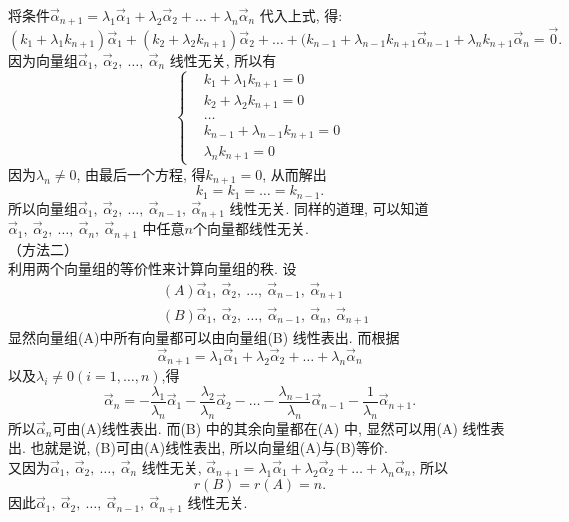 \documentclass[a4paper]{book}
\begin{document}
将条件$\vec{\alpha}_{n+1}=\lambda_1\vec{\alpha}_1+\lambda_2\vec{\alpha}_2+\dots+\lambda_n\vec{\alpha}_n$ 代入上式, 得:
$$(k_1+\lambda_1k_{n+1})\vec{\alpha}_1+(k_2+\lambda_2k_{n+1})\vec{\alpha}_2+\dots+(k_{n-1}+\lambda_{n-1}k_{n+1}\vec{\alpha}_{n-1}+
\lambda_nk_{n+1}\vec{\alpha}_n=\vec{0}.$$
因为向量组$\vec{\alpha}_1, \ \vec{\alpha}_2, \ \dots,\ \vec{\alpha}_n$ 线性无关, 所以有
\begin{displaymath}\left\{\begin{aligned}&k_1+\lambda_1k_{n+1}=0\\&k_2+\lambda_2k_{n+1}=0\\&\dots \\ &k_{n-1}+\lambda_{n-1}k_{n+1}=0 \\ &\lambda_nk_{n+1}=0\end{aligned}
\right.\end{displaymath}
因为$\lambda_n\not=0$, 由最后一个方程, 得$k_{n+1}=0$, 从而解出$$k_1=k_1=\dots=k_{n-1}.$$
所以向量组$\vec{\alpha}_1, \ \vec{\alpha}_2, \ \dots,\ \vec{\alpha}_{n-1},\ \vec{\alpha}_{n+1}$ 线性无关. 同样的道理,
可以知道$\vec{\alpha}_1, \ \vec{\alpha}_2, \ \dots,\ \vec{\alpha}_n,\ \vec{\alpha}_{n+1}$ 中任意$n$个向量都线性无关.\\
（方法二）\\
利用两个向量组的等价性来计算向量组的秩. 设
\begin{displaymath}\begin{aligned}&(A)\vec{\alpha}_1,  \ \vec{\alpha}_2, \ \dots,\ \vec{\alpha}_{n-1},\ \vec{\alpha}_{n+1}\\
&(B)\vec{\alpha}_1, \ \vec{\alpha}_2, \ \dots,\ \vec{\alpha}_{n-1},\ \vec{\alpha}_n,\ \vec{\alpha}_{n+1}\end{aligned}\end{displaymath}
显然向量组(A)中所有向量都可以由向量组(B) 线性表出. 而根据$$\vec{\alpha}_{n+1}=\lambda_1\vec{\alpha}_1+\lambda_2\vec{\alpha}_2+\dots+\lambda_n\vec{\alpha}_n$$ 以及$\lambda_i\not=0(i=1,
\dots,n)$,得
$$\vec{\alpha}_n=-\frac{\lambda_1}{\lambda_n}\vec{\alpha}_1-\frac{\lambda_2}{\lambda_n}\vec{\alpha}_2-\dots-
\frac{\lambda_{n-1}}{\lambda_n}\vec{\alpha}_{n-1}-\frac{1}{\lambda_n}\vec{\alpha}_{n+1}.$$
所以$\vec{\alpha}_n$可由(A)线性表出. 而(B) 中的其余向量都在(A) 中, 显然可以用(A) 线性表出. 也就是说, (B)可由(A)线性表出, 所以向量组(A)与(B)等价.\\
又因为$\vec{\alpha}_1, \ \vec{\alpha}_2, \ \dots,\ \vec{\alpha}_n$ 线性无关, $\vec{\alpha}_{n+1}=\lambda_1\vec{\alpha}_1+\lambda_2\vec{\alpha}_2+\dots+\lambda_n\vec{\alpha}_n$, 所以
$$r(B)=r(A)=n.$$因此$\vec{\alpha}_1, \ \vec{\alpha}_2, \ \dots,\ \vec{\alpha}_{n-1},\ \vec{\alpha}_{n+1}$ 线性无关.\\
\end{document}
